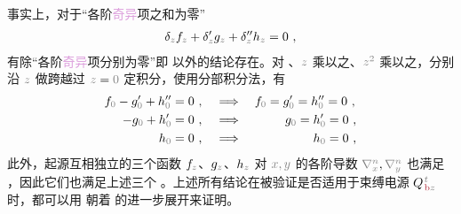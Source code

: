 事实上，对于“各阶\textcolor{Plum}{奇异}项之和为零”
\abovedisplayskip=5pt
\begin{align} \label{eq:deltasum=0}
	{\delta}_{\mathcolor{gray}{z}} f_{\mathcolor{gray}{z}} + {\delta}'_{\mathcolor{gray}{z}} g_{\mathcolor{gray}{z}} + 
	{\delta}''_{\mathcolor{gray}{z}} h_{\mathcolor{gray}{z}} = 0 ~,
\end{align}
有除“各阶\textcolor{Plum}{奇异}项分别为零”即  以外的结论存在。对 、$\mathcolor{gray}{z}$ 乘以之、$\mathcolor{gray}{z^2}$ 乘以之，分别沿 $\mathcolor{gray}{z}$ 做跨越过 $\mathcolor{gray}{z} = \mathcolor{gray}{0}$ 定积分，使用分部积分法\cite{delangeElectromagneticBoundaryConditions2013}，有
\begin{subequations} \label{eq:Intdeltasum=0}
	\abovedisplayskip=6pt
\begin{align}
	f_{\mathcolor{gray}{0}} - g'_{\mathcolor{gray}{0}} + h''_{\mathcolor{gray}{0}} &= 0~, \hspace{1.2em} \Longrightarrow \hspace{1em} f_{\mathcolor{gray}{0}} = g'_{\mathcolor{gray}{0}} = h''_{\mathcolor{gray}{0}} = 0~, \label{eq:intdeltasum=0} \\
	- g_{\mathcolor{gray}{0}} + h'_{\mathcolor{gray}{0}} &= 0~, \hspace{1.2em} \Longrightarrow \hspace{1em} \hphantom{f_{\mathcolor{gray}{0}} =}~\;\! g_{\mathcolor{gray}{0}} = h'_{\mathcolor{gray}{0}} = 0~, \label{eq:intzdeltasum=0} \\
	h_{\mathcolor{gray}{0}} &= 0~, \hspace{1.2em} \Longrightarrow \hspace{1em} \hphantom{f_{\mathcolor{gray}{0}} = g_{\mathcolor{gray}{0}} =}~\;\! h_{\mathcolor{gray}{0}} = 0~, \label{eq:intzzdeltasum=0}
\end{align}
\end{subequations}
此外，起源互相独立的三个函数 $f_{\mathcolor{gray}{z}}$、$g_{\mathcolor{gray}{z}}$、$h_{\mathcolor{gray}{z}}$ 对 $\mathcolor{gray}{x,y}$ 的各阶导数 $\mathcolor{gray}{\nabla_x^n},\mathcolor{gray}{\nabla_y^n}$ 也满足 ，因此它们也满足上述三个 。上述所有结论在被验证是否适用于束缚电源 ${Q}^{\;\!\mathcolor{gray}{t}}_{\;\!\textcolor{Maroon}{\text{b}}\mathcolor{gray}{z}}$ 时，都可以用  朝着  的进一步展开来证明。

\vspace*{-4.5em}

